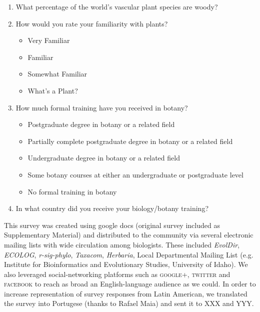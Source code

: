 \documentclass[12pt]{article}
\begin{document}
\begin{enumerate}

\item What percentage of the world's vascular plant species are woody?

\item How would you rate your familiarity with plants?

	\begin{itemize}
	
		\item Very Familiar
	
		\item Familiar
	
		\item Somewhat Familiar
	
		\item What's a Plant?
	
	\end{itemize}
	
\item How much formal training have you received in botany?

	\begin{itemize}
	
		\item Postgraduate degree in botany or a related field
		
		\item Partially complete postgraduate degree in botany or a related field
		
		\item Undergraduate degree in botany or a related field
		
		\item Some botany courses at either an undergraduate or postgraduate level
		
		\item No formal training in botany
		
	\end{itemize}
	
\item In what country did you receive your biology/botany training?

\end{enumerate}

This survey was created using google docs (original survey included as Supplementary Material) and distributed to the community via several electronic mailing lists with wide circulation among biologists. These included \emph{EvolDir}, \emph{ECOLOG}, \emph{r-sig-phylo}, \emph{Taxacom}, \emph{Herbaria}, Local Departmental Mailing List (e.g. Institute for Bioinformatics and Evolutionary Studies, University of Idaho). We also leveraged social-networking platforms such as \textsc{google}+, \textsc{twitter} and \textsc{facebook} to reach as broad an English-language audience as we could. In order to increase representation of survey responses from Latin American, we translated the survey into Portugese (thanks to Rafael Maia) and sent it to XXX and YYY.
\end{document}
